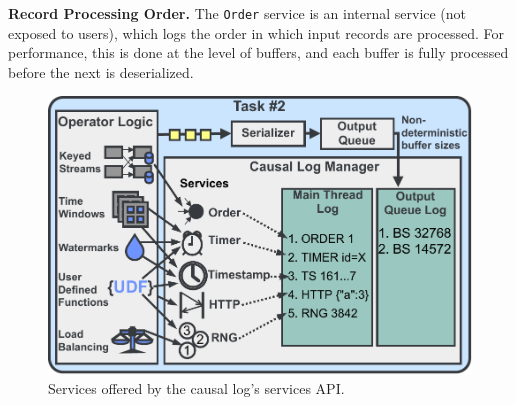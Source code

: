 \documentclass[sigconf]{acmart}
\newcommand{\para}[1]{\vspace{1mm}\noindent\textbf{#1.}}
\begin{document}
\para{Record Processing Order} The \texttt{Order} service is an internal service (not exposed to users), which logs the order in which input records are processed. 
For performance, this is done at the level of buffers, and each buffer is fully processed before the next is deserialized.

\begin{figure}[t]
  \centering
  \includegraphics[width=0.8\columnwidth]{Figures/services.pdf}
\vspace{-2mm}
  \caption{Services offered by the causal log's services API.}
\label{fig:causal_log}
\vspace{-4mm}
\end{figure}
\end{document}
